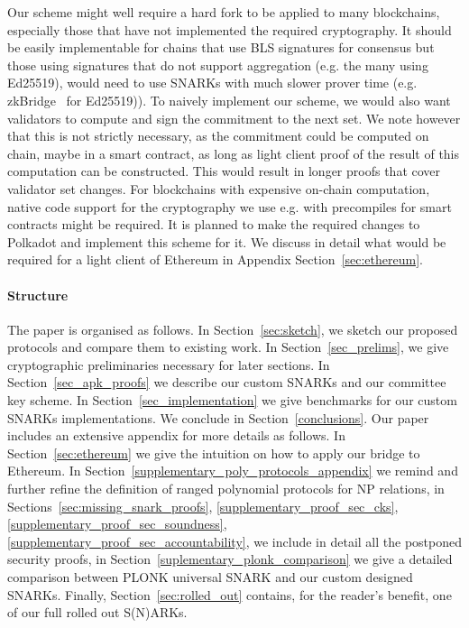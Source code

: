 \noindent Our scheme might well require a hard fork to be applied to many blockchains, especially those that have not implemented the required cryptography. It should be easily implementable for chains that use BLS signatures for consensus but those using signatures that do not support aggregation (e.g. the many using Ed25519), would need to use SNARKs with much slower prover time (e.g. zkBridge~\cite{zkBridge} for Ed25519)). To naively implement our scheme, we would also want validators to compute and sign the commitment to the next set. We note however that this is not strictly necessary, as the commitment could be computed on chain, maybe in a smart contract, as long as light client proof of the result of this computation can be constructed. This would result in longer proofs that cover validator set changes. For blockchains with expensive on-chain computation, native code support for the cryptography we use e.g. with precompiles for smart contracts might be required. It is planned to make the required changes to Polkadot and implement this scheme for it. We discuss in detail what would be required for a light client of Ethereum in Appendix Section~\ref{sec:ethereum}. \\
\vspace{-0.1in}
\paragraph{Structure} The paper is organised as follows. 
In Section~\ref{sec:sketch}, we sketch our proposed protocols and compare 
them to existing work. In Section~\ref{sec_prelims}, we give cryptographic 
preliminaries necessary for later sections. In Section~\ref{sec_apk_proofs}
we describe our custom SNARKs and our committee key scheme. In 
Section~\ref{sec_implementation} we give benchmarks for our custom SNARKs 
implementations. We conclude in Section~\ref{conclusions}. Our paper includes 
an extensive appendix for more details as follows. In Section~\ref{sec:ethereum} we give the 
intuition on how to apply our bridge to Ethereum. In Section~\ref{supplementary_poly_protocols_appendix} 
we remind and further refine the definition of ranged polynomial protocols for NP relations, 
in Sections~\ref{sec:missing_snark_proofs}, \ref{supplementary_proof_sec_cks}, 
\ref{supplementary_proof_sec_soundness}, \ref{supplementary_proof_sec_accountability}, 
we include in detail all the postponed security proofs, in Section~\ref{suplementary_plonk_comparison} 
we give a detailed comparison between PLONK universal SNARK and our custom designed SNARKs. 
Finally, Section~\ref{sec:rolled_out} contains, for the reader's benefit, one of our full rolled out S(N)ARKs. 
\vspace{-0.25cm}
